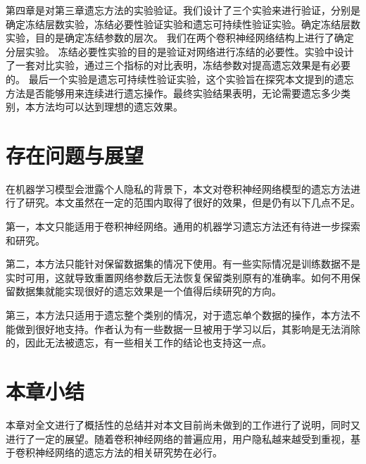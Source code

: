 第四章是对第三章遗忘方法的实验验证。我们设计了三个实验来进行验证，分别是确定冻结层数实验，冻结必要性验证实验和遗忘可持续性验证实验。确定冻结层数实验，目的是确定冻结参数的层次。
我们在两个卷积神经网络结构上进行了确定分层实验。
冻结必要性实验的目的是验证对网络进行冻结的必要性。实验中设计了一套对比实验，通过三个指标的对比表明，冻结参数对提高遗忘效果是有必要的。
最后一个实验是遗忘可持续性验证实验，这个实验旨在探究本文提到的遗忘方法是否能够用来连续进行遗忘操作。最终实验结果表明，无论需要遗忘多少类别，本方法均可以达到理想的遗忘效果。

\section{存在问题与展望}
在机器学习模型会泄露个人隐私的背景下，本文对卷积神经网络模型的遗忘方法进行了研究。本文虽然在一定的范围内取得了很好的效果，但是仍有以下几点不足。

第一，本文只能适用于卷积神经网络。通用的机器学习遗忘方法还有待进一步探索和研究。

第二，本方法只能针对保留数据集的情况下使用。有一些实际情况是训练数据不是实时可用，这就导致重置网络参数后无法恢复保留类别原有的准确率。如何不用保留数据集就能实现很好的遗忘效果是一个值得后续研究的方向。

第三，本方法只适用于遗忘整个类别的情况，对于遗忘单个数据的操作，本方法不能做到很好地支持。作者认为有一些数据一旦被用于学习以后，其影响是无法消除的，因此无法被遗忘，有一些相关工作\cite{2018arXiv181205159T}的结论也支持这一点。

\section{本章小结}
本章对全文进行了概括性的总结并对本文目前尚未做到的工作进行了说明，同时又进行了一定的展望。随着卷积神经网络的普遍应用，用户隐私越来越受到重视，基于卷积神经网络的遗忘方法的相关研究势在必行。